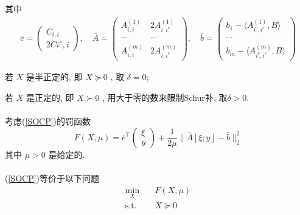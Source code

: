 \documentclass[a4paper, UTF8]{ctexart}				%
\numberwithin{equation}{section}				%
\begin{document}
				其中
				\begin{equation}
					\begin{split}\label{SOCPCondition}
							\bar{c}
						=	\begin{pmatrix} C_{i, i} \\ 2C{i^c, i} \end{pmatrix} , \quad
							\bar{A}
						=	\begin{pmatrix}
								A^{(1)}_{i, i} & 2A^{(1)}_{i, i^c} \\
								\cdots & \cdots \\
								A^{(m)}_{i, i} & 2A^{(m)}_{i, i^c}
							\end{pmatrix} , \quad
							\bar{b}
						=	\begin{pmatrix}
								b_1 - \langle{A^{(1)}_{i^c, i^c}, B}\rangle \\
								\cdots \\
								b_m - \langle{A^{(m)}_{i^c, i^c}, B}\rangle 
							\end{pmatrix}
					\end{split}
				\end{equation}
				
				若 $X$ 是半正定的, 即 $X \succeq 0$ , 取 $\delta = 0$; 
				
				若 $X$ 是正定的, 即 $X \succ 0$ , 用大于零的数来限制Schur补, 取$\delta > 0$.

			\paragraph{}
				\quad 考虑(\ref{SOCP})的罚函数
				\begin{equation}\label{Powell}
						F(X, \mu)
					=	\bar{c}^\top \begin{pmatrix}\xi \\ y\end{pmatrix} + \frac{1}{2\mu} \lVert{\bar{A}[\xi; y] - \bar{b}}\rVert^2_2
				\end{equation}
				其中 $\mu > 0$ 是给定的.

			\paragraph{}
				\quad (\ref{SOCP})等价于以下问题
				\begin{equation}
					\begin{split}\label{PowellQ}
						\min_{X} \quad
							& F(X, \mu)\\
						\text{s.t.} \quad
							& X \succeq 0
					\end{split}
				\end{equation}
\end{document}
